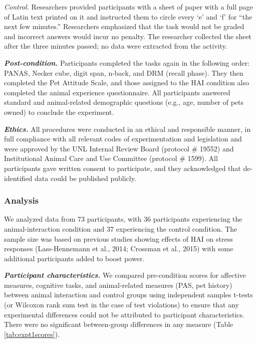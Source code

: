 \documentclass[
  english,
  pub,floatsintext]{apa6}
\begin{document}
\emph{Control.}
Researchers provided participants with a sheet of paper with a full page of Latin text printed on it and instructed them to circle every `e' and `f' for ``the next few minutes.'' Researchers emphasized that the task would not be graded and incorrect answers would incur no penalty. The researcher collected the sheet after the three minutes passed; no data were extracted from the activity.

\textbf{\emph{Post-condition.}}
Participants completed the tasks again in the following order: PANAS, Necker cube, digit span, n-back, and DRM (recall phase). They then completed the Pet Attitude Scale, and those assigned to the HAI condition also completed the animal experience questionnaire. All participants answered standard and animal-related demographic questions (e.g., age, number of pets owned) to conclude the experiment.

\textbf{\emph{Ethics.}}
All procedures were conducted in an ethical and responsible manner, in full compliance with all relevant codes of experimentation and legislation and were approved by the UNL Internal Review Board (protocol \# 19552) and Institutional Animal Care and Use Committee (protocol \# 1599). All participants gave written consent to participate, and they acknowledged that de-identified data could be published publicly.

\hypertarget{analysis}{%
\subsubsection{Analysis}\label{analysis}}

We analyzed data from 73 participants, with 36 participants experiencing the animal-interaction condition and 37 experiencing the control condition. The sample size was based on previous studies showing effects of HAI on stress responses (Lass-Hennemann et al., 2014; Crossman et al., 2015) with some additional participants added to boost power.

\textbf{\emph{Participant characteristics.}}
We compared pre-condition scores for affective measures, cognitive tasks, and animal-related measures (PAS, pet history) between animal interaction and control groups using independent samples t-tests (or Wilcoxon rank sum test in the case of test violations) to ensure that any experimental differences could not be attributed to participant characteristics. There were no significant between-group differences in any measure (Table \ref{tab:expt1scores}).
\end{document}

